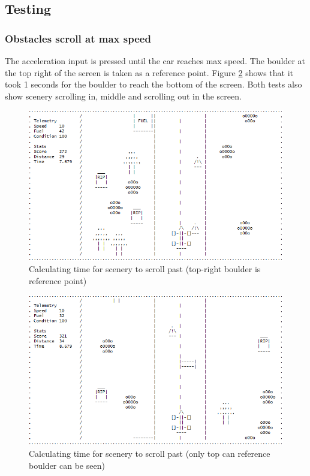 \documentclass{article}
\begin{document}
\subsection*{Testing}
\subsubsection*{Obstacles scroll at max speed}
The acceleration input is pressed until the car reaches max speed. The boulder at the top right of the screen is taken as a reference point. Figure \ref{fig:obs_test_maxspeedscroll2} shows that it took 1 seconds for the boulder to reach the bottom of the screen. Both tests also show scenery scrolling in, middle and scrolling out in the screen.
\begin{figure}[!ht]
	\begin{center}
	\includegraphics[width=0.63\paperwidth]{images/obs_test_maxspeedscroll}
	\caption{Calculating time for scenery to scroll past (top-right boulder is reference point)}
	\label{fig:obs_test_maxspeedscroll} 
	\end{center}
\end{figure}
\begin{figure}[!ht]
	\begin{center}
	\includegraphics[width=0.63\paperwidth]{images/obs_test_maxspeedscroll2}
	\caption{Calculating time for scenery to scroll past (only top can reference boulder can be seen)}
	\label{fig:obs_test_maxspeedscroll2} 
	\end{center}
\end{figure}
\clearpage
\end{document}
